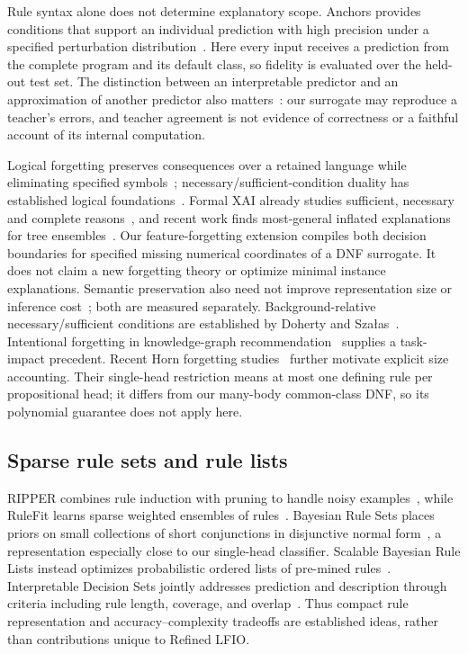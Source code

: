 \documentclass[review,12pt]{elsarticle}
\begin{document}
Rule syntax alone does not determine explanatory scope. Anchors provides conditions that support an individual prediction with high precision under a specified perturbation distribution~\citep{ribeiro2018}. Here every input receives a prediction from the complete program and its default class, so fidelity is evaluated over the held-out test set. The distinction between an interpretable predictor and an approximation of another predictor also matters~\citep{rudin2019}: our surrogate may reproduce a teacher's errors, and teacher agreement is not evidence of correctness or a faithful account of its internal computation.

Logical forgetting preserves consequences over a retained language while eliminating specified symbols~\citep{lin1994forget}; necessary/sufficient-condition duality has established logical foundations~\citep{lin2001conditions}. Formal XAI already studies sufficient, necessary and complete reasons~\citep{darwiche2020reasons}, and recent work finds most-general inflated explanations for tree ensembles~\citep{izza2025general}. Our feature-forgetting extension compiles both decision boundaries for specified missing numerical coordinates of a DNF surrogate. It does not claim a new forgetting theory or optimize minimal instance explanations. Semantic preservation also need not improve representation size or inference cost~\citep{levy1994forget}; both are measured separately. Background-relative necessary/sufficient conditions are established by Doherty and Sza{\l}as~\citep{doherty2024dualforgetting}. Intentional forgetting in knowledge-graph recommendation~\citep{wang2024forgettingkgrs} supplies a task-impact precedent. Recent Horn forgetting studies~\citep{liberatore2024commonsize,liberatore2025onehead} further motivate explicit size accounting. Their single-head restriction means at most one defining rule per propositional head; it differs from our many-body common-class DNF, so its polynomial guarantee does not apply here.

\subsection{Sparse rule sets and rule lists}
RIPPER combines rule induction with pruning to handle noisy examples~\citep{cohen1995}, while RuleFit learns sparse weighted ensembles of rules~\citep{friedman2008}. Bayesian Rule Sets places priors on small collections of short conjunctions in disjunctive normal form~\citep{wang2017brs}, a representation especially close to our single-head classifier. Scalable Bayesian Rule Lists instead optimizes probabilistic ordered lists of pre-mined rules~\citep{yang2017}. Interpretable Decision Sets jointly addresses prediction and description through criteria including rule length, coverage, and overlap~\citep{lakkaraju2016}. Thus compact rule representation and accuracy--complexity tradeoffs are established ideas, rather than contributions unique to Refined LFIO.
\end{document}
